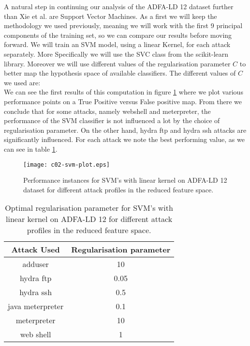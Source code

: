 \documentclass[reqno,openany,12pt]{amsbook}
\newcommand{\beqq}{\begin{equation*}}
\newcommand{\eeqq}{\end{equation*}}
\begin{document}
A natural step in continuing our analysis of the ADFA-LD 12 dataset further than Xie et al.\cite{adf1} are Support Vector Machines. As a first we will keep the methodology we used previously, meaning we will work with the first 9 principal components of the training set, so we can compare our results before moving forward. We will train an SVM model, using a linear Kernel, for each attack separately. More Specifically we will use the SVC class from the scikit-learn library\cite{skl}. Moreover we will use different values of the regularisation parameter $C$ to better map the hypothesis space of available classifiers. The different values of $C$ we used are: 
\beqq
[0.05, 0.1, 0.5, 1, 5, 10, 50]
\eeqq
We can see the first results of this computation in figure \ref{svm-fr1} where we plot various performance points on a True Positive versus False positive map. From there we conclude that for some attacks, namely webshell and meterpreter, the performance of the SVM classifier is not influenced a lot by the choice of  regularisation parameter. On the other hand, hydra ftp and hydra ssh attacks are significantly influenced. For each attack we note the best performing value, as we can see in table \ref{svmt1}.


\begin{figure}
\texttt{[image: c02-svm-plot.eps]}
\caption[Performance instances for SVM's with linear kernel for different attack profiles.]{Performance instances for SVM's with linear kernel on ADFA-LD 12 dataset for different attack profiles in the reduced feature space.}
\label{svm-fr1}
\end{figure}

\begin{table}
\begin{tabular}{|c|c|}
\hline
Attack Used &  Regularisation parameter \\ \hline 
adduser          & 10 \\ \hline
hydra ftp        & 0.05 \\ \hline
hydra ssh        & 0.5 \\ \hline
java meterpreter & 0.1 \\ \hline
meterpreter      & 10 \\ \hline
web shell        & 1 \\ \hline
\end{tabular}
\vspace{5pt}
\caption[Optimal regularisation parameter for linear SVM's for different attack profiles.]{Optimal regularisation parameter for SVM's with linear kernel on ADFA-LD 12 for different attack profiles in the reduced feature space.}
\label{svmt1}
\end{table}
\end{document}

